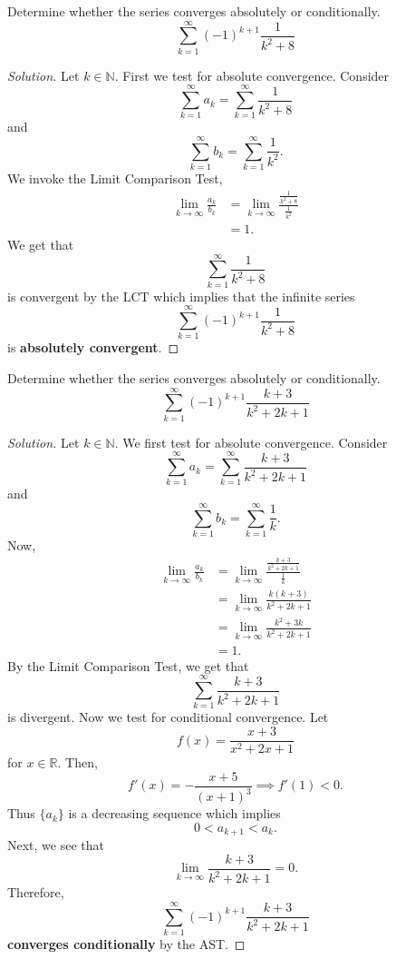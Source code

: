 \documentclass[compacto,10pt,comentarios]{aleph-notas}
\begin{document}
\begin{ejer}
    Determine whether the series converges absolutely or conditionally.
    $$
        \sum_{k=1}^{\infty} (-1)^{k+1} \frac{1}{k^2 + 8}
    $$
\end{ejer}
\begin{proof}[Solution]
    Let $k \in \mathbb{N}$. First we test for absolute convergence. Consider
    $$
        \sum_{k=1}^{\infty} a_k
        = \sum_{k=1}^{\infty} \frac{1}{k^{2} + 8}
    $$
    and
    $$
        \sum_{k=1}^{\infty} b_k
        = \sum_{k=1}^{\infty} \frac{1}{k^{2}}.
    $$
    We invoke the Limit Comparison Test,
    \begin{align*}
        \lim_{k \to \infty} \frac{a_k}{b_k}
        & = \lim_{k \to \infty} \frac{\frac{1}{k^{2} + 8}}{\frac{1}{k^{2}}} \\
        & = 1.
    \end{align*}
    We get that 
    $$
        \sum_{k=1}^{\infty} \frac{1}{k^{2} + 8}
    $$
    is convergent by the LCT which implies that the infinite series
    $$
        \sum_{k=1}^{\infty} (-1)^{k+1} \frac{1}{k^2 + 8}
    $$
    is \textbf{absolutely convergent}.
\end{proof}

\begin{ejer}
    Determine whether the series converges absolutely or conditionally.
    $$
        \sum_{k=1}^{\infty} (-1)^{k+1} \frac{k+3}{k^2 + 2k + 1}
    $$
\end{ejer}
\begin{proof}[Solution]
    Let $k \in \mathbb{N}$. We first test for absolute convergence. Consider
    $$
        \sum_{k=1}^{\infty} a_k = \sum_{k=1}^{\infty} \frac{k+3}{k^2 + 2k +1}
    $$
    and 
    $$
        \sum_{k=1}^{\infty} b_k = \sum_{k=1}^{\infty} \frac{1}{k}.
    $$
    Now,
    \begin{align*}
        \lim_{k \to \infty} \frac{a_k}{b_k}
        & = \lim_{k \to \infty} \frac{\frac{k+3}{k^2 + 2k +1}}{\frac{1}{k}} \\
        & = \lim_{k \to \infty} \frac{k(k+3)}{k^{2} + 2k + 1} \\
        & = \lim_{k \to \infty} \frac{k^2 + 3k}{k^{2} + 2k + 1} \\ 
        & = 1.
    \end{align*}
    By the Limit Comparison Test, we get that
    $$
        \sum_{k=1}^{\infty} \frac{k+3}{k^2 + 2k +1}
    $$
    is divergent. Now we test for conditional convergence. Let 
    $$
        f(x) = \frac{x+3}{x^2+2x+1}
    $$
    for $x \in \mathbb{R}$. Then,
    $$
        f'(x) = -\frac{x+5}{(x+1)^3} \implies f'(1) < 0.
    $$
    Thus $\{a_k\}$ is a decreasing sequence which implies
    $$
        0 < a_{k+1} < a_{k}.
    $$
    Next, we see that
    $$
        \lim_{k \to \infty} \frac{k+3}{k^2 + 2k + 1} = 0.
    $$
    Therefore,
    $$
        \sum_{k=1}^{\infty} (-1)^{k+1} \frac{k+3}{k^2 + 2k + 1}
    $$
    \textbf{converges conditionally} by the AST.
\end{proof}
\end{document}
